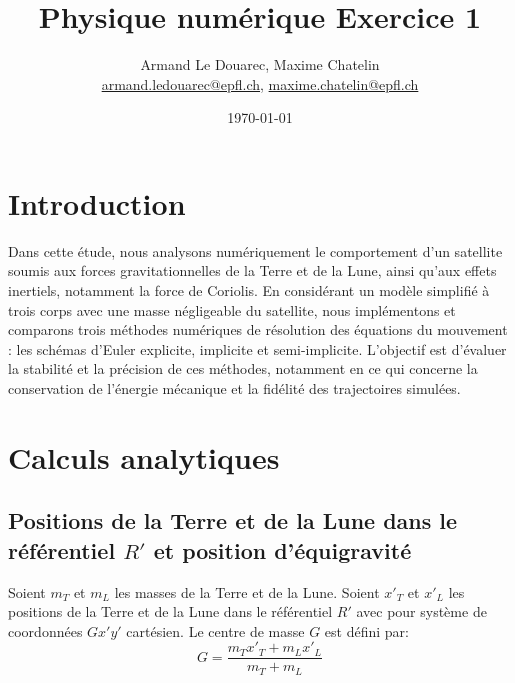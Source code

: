 \documentclass[a4paper,12pt,twoside]{article}
\newcommand{\mail}[1]{{\href{mailto:#1}{#1}}}
\begin{document}
\title{Physique numérique Exercice 1}
\author{Armand Le Douarec, Maxime Chatelin\\  %
{\small \mail{armand.ledouarec@epfl.ch}, \mail{maxime.chatelin@epfl.ch}}}
\date{\today}\maketitle
\tableofcontents %

\baselineskip=16pt
\parindent=0pt
\parskip=12pt

\section{Introduction}

Dans cette étude, nous analysons numériquement le comportement d'un satellite soumis aux forces gravitationnelles de la Terre et de la Lune, ainsi qu'aux effets inertiels, notamment la force de Coriolis. En considérant un modèle simplifié à trois corps avec une masse négligeable du satellite, nous implémentons et comparons trois méthodes numériques de résolution des équations du mouvement : les schémas d'Euler explicite, implicite et semi-implicite. L'objectif est d'évaluer la stabilité et la précision de ces méthodes, notamment en ce qui concerne la conservation de l'énergie mécanique et la fidélité des trajectoires simulées.

\section{Calculs analytiques}

\subsection{Positions de la Terre et de la Lune dans le référentiel $R'$ et position d'équigravité}
Soient $m_T$ et $m_L$ les masses de la Terre et de la Lune. Soient $x'_T$ et $x'_L$ les positions de la Terre et de la Lune dans le référentiel $R'$ avec pour système de coordonnées $Gx'y'$ cartésien. Le centre de masse $G$ est défini par:\\

\begin{equation}
G = \displaystyle \frac{m_Tx'_T+m_Lx'_L}{m_T+m_L}
\end{equation}
\end{document}
